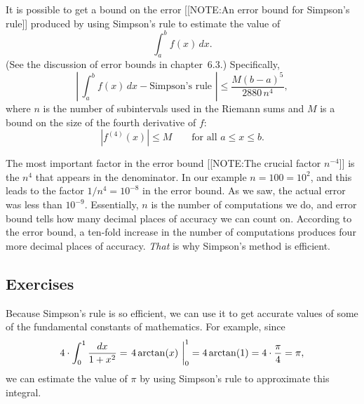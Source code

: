 It is possible to get a bound on the error 
[[NOTE:An error bound for Simpson's rule]]
produced by using Simpson's rule to estimate the value of
	\[
\int_a^b f(x) \, dx.
\]
(See the discussion of error bounds in chapter~6.3.)  Specifically,
	\[
\left| \, \int_a^b f(x) \, dx - \mbox{Simpson's rule } \right| \leq
		\dfrac{M (b - a)^5}{2880 \, n^4},
\] 
where $n$ is the number of subintervals used in the Riemann sums and $M$ is a bound on the size of the fourth derivative of $f$:
	\[
|f^{(4)}(x)| \leq M \qquad \mbox{for all $a \leq x \leq b$.}
\]



The most important factor in the error bound 
[[NOTE:The crucial factor $n^{-4}$]]
is the $n^4$ that appears in the denominator.  In our example $n = 100
= 10^2$, and this leads to the factor $1/n^4 = 10^{-8}$ in the error
bound.  As we saw, the actual error was less than $10^{-9}$.
Essentially, $n$ is the number of computations we do, and error bound
tells how many decimal places of accuracy we can count on.  According
to the error bound, a ten-fold increase in the number of computations
produces four more decimal places of accuracy.  {\em That\/} is why
Simpson's method is efficient.

\subsection{Exercises}
\label{subsec:exercises}



Because Simpson's rule is so efficient, we can use it to get
accurate values of some of the fundamental constants of mathematics.
For example, since
	\[
4 \cdot \int_0^1 \dfrac{dx}{1 + x^2} =  
		\left. 4\arctan(x) \ \vphantom{\dfrac{1}{2}} \right|_0^1 = 
		4\arctan(1) = 4 \cdot \dfrac{\pi}{4} = \pi,
\]
we can estimate the value of $\pi$ by using Simpson's rule to
approximate this integral.



